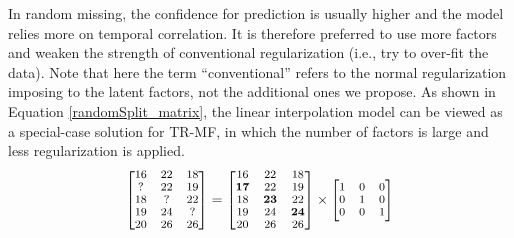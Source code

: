 In random missing, the confidence for prediction is usually higher and the model relies more on temporal correlation.
It is therefore preferred to use more factors and weaken the strength of conventional regularization (i.e., try to over-fit the data).
Note that here the term ``conventional'' refers to the normal regularization imposing to the latent factors, not the additional ones we propose. 
As shown in Equation \ref{randomSplit_matrix}, the linear interpolation model can be viewed as a special-case solution for TR-MF, in which the number of factors is large and less regularization is applied. 
\begin{equation}
\small
\label{randomSplit_matrix}
\begin{bmatrix}
16 & 22 & 18\\
 ? & 22 & 19\\
18 &  ?	& 22\\
19 & 24 &  ?\\
20 & 26 & 26\\
\end{bmatrix} 
= 
\begin{bmatrix}
16 & 22 & 18\\
\mathbf{17} & 22 & 19\\
18 & \mathbf{23}	& 22\\
19 & 24 & \mathbf{24}\\
20 & 26 & 26\\
\end{bmatrix} 
\times
\begin{bmatrix}
1 & 0 & 0\\
0 & 1 & 0\\
0 & 0 & 1\\
\end{bmatrix} 
\end{equation}

